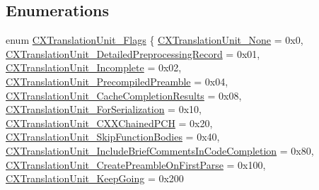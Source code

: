 \subsection*{Enumerations}
\begin{DoxyCompactItemize}
\item 
enum \mbox{\hyperlink{group__CINDEX__TRANSLATION__UNIT_gab1e4965c1ebe8e41d71e90203a723fe9}{C\+X\+Translation\+Unit\+\_\+\+Flags}} \{ \newline
\mbox{\hyperlink{group__CINDEX__TRANSLATION__UNIT_ggab1e4965c1ebe8e41d71e90203a723fe9afdea7f108d517d6e212d762e41a48480}{C\+X\+Translation\+Unit\+\_\+\+None}} = 0x0, 
\mbox{\hyperlink{group__CINDEX__TRANSLATION__UNIT_ggab1e4965c1ebe8e41d71e90203a723fe9a9e1dd69c4a2ff7954dca8df41a63c0e6}{C\+X\+Translation\+Unit\+\_\+\+Detailed\+Preprocessing\+Record}} = 0x01, 
\mbox{\hyperlink{group__CINDEX__TRANSLATION__UNIT_ggab1e4965c1ebe8e41d71e90203a723fe9ad7cfbf9284a37c4324fc86fc7e4bcfc1}{C\+X\+Translation\+Unit\+\_\+\+Incomplete}} = 0x02, 
\mbox{\hyperlink{group__CINDEX__TRANSLATION__UNIT_ggab1e4965c1ebe8e41d71e90203a723fe9a790e560dd51389cb9dc370fe40ba60f8}{C\+X\+Translation\+Unit\+\_\+\+Precompiled\+Preamble}} = 0x04, 
\newline
\mbox{\hyperlink{group__CINDEX__TRANSLATION__UNIT_ggab1e4965c1ebe8e41d71e90203a723fe9a050d92c8ce5d72b25d0993025bdf5be8}{C\+X\+Translation\+Unit\+\_\+\+Cache\+Completion\+Results}} = 0x08, 
\mbox{\hyperlink{group__CINDEX__TRANSLATION__UNIT_ggab1e4965c1ebe8e41d71e90203a723fe9a9a020ecb5e423aa440802c02551ce667}{C\+X\+Translation\+Unit\+\_\+\+For\+Serialization}} = 0x10, 
\mbox{\hyperlink{group__CINDEX__TRANSLATION__UNIT_ggab1e4965c1ebe8e41d71e90203a723fe9a442818d0c34982dd0737deb62a6db397}{C\+X\+Translation\+Unit\+\_\+\+C\+X\+X\+Chained\+P\+CH}} = 0x20, 
\mbox{\hyperlink{group__CINDEX__TRANSLATION__UNIT_ggab1e4965c1ebe8e41d71e90203a723fe9acdefcb715af5ab334f99508163135df0}{C\+X\+Translation\+Unit\+\_\+\+Skip\+Function\+Bodies}} = 0x40, 
\newline
\mbox{\hyperlink{group__CINDEX__TRANSLATION__UNIT_ggab1e4965c1ebe8e41d71e90203a723fe9af43ae6fc616cdbc78575344dc984b24c}{C\+X\+Translation\+Unit\+\_\+\+Include\+Brief\+Comments\+In\+Code\+Completion}} = 0x80, 
\mbox{\hyperlink{group__CINDEX__TRANSLATION__UNIT_ggab1e4965c1ebe8e41d71e90203a723fe9aa27840716b90a9346019c9f0914f9ab8}{C\+X\+Translation\+Unit\+\_\+\+Create\+Preamble\+On\+First\+Parse}} = 0x100, 
\mbox{\hyperlink{group__CINDEX__TRANSLATION__UNIT_ggab1e4965c1ebe8e41d71e90203a723fe9afda3272e16e2aa499fc265615991f968}{C\+X\+Translation\+Unit\+\_\+\+Keep\+Going}} = 0x200

\end{DoxyCompactItemize}
